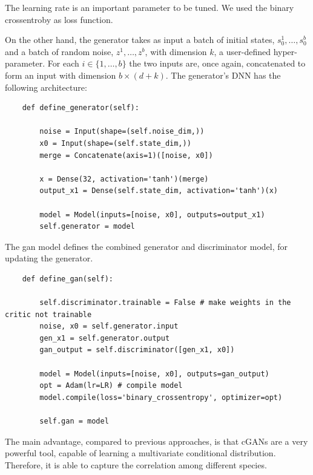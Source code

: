\documentclass{article}
\begin{document}
The learning rate is an important parameter to be tuned. We used the binary crossentroby as loss function.

On the other hand, the generator takes as input a batch of initial states, $s_0^1,\dots , s_0^b$ and a batch of random noise, $z^1,\dots , z^b$, with dimension $k$, a user-defined hyper-parameter. For each $i\in\{ 1,\dots , b\}$ the two inputs are, once again, concatenated to form an input with dimension $b\times (d+k)$. The generator's DNN has the following architecture:
\begin{lstlisting}
    def define_generator(self):
		
		noise = Input(shape=(self.noise_dim,)) 
		x0 = Input(shape=(self.state_dim,))
		merge = Concatenate(axis=1)([noise, x0])
		
		x = Dense(32, activation='tanh')(merge)
        output_x1 = Dense(self.state_dim, activation='tanh')(x)

		model = Model(inputs=[noise, x0], outputs=output_x1)
		self.generator = model
\end{lstlisting}

The gan model defines the combined generator and discriminator model, for updating the generator.
\begin{lstlisting}
	def define_gan(self):

		self.discriminator.trainable = False # make weights in the critic not trainable
		noise, x0 = self.generator.input
		gen_x1 = self.generator.output
		gan_output = self.discriminator([gen_x1, x0])

		model = Model(inputs=[noise, x0], outputs=gan_output)
		opt = Adam(lr=LR) # compile model
		model.compile(loss='binary_crossentropy', optimizer=opt)
		
		self.gan = model
\end{lstlisting}

The main advantage, compared to previous approaches, is that cGANs are a very powerful tool, capable of learning a multivariate conditional distribution. Therefore, it is able to capture the correlation among different species.
\end{document}
